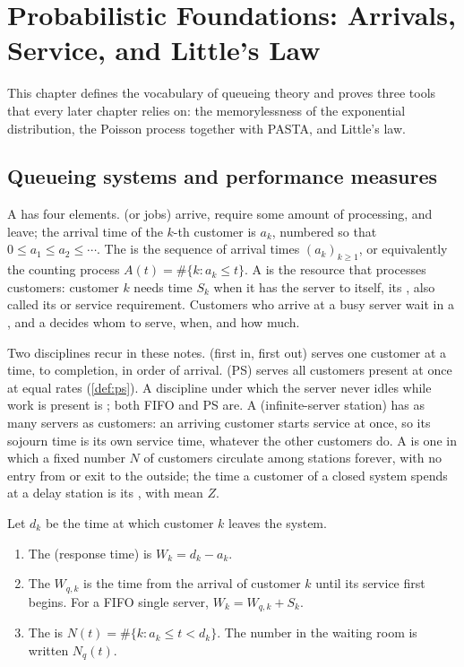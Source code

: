 \chapter{Probabilistic Foundations: Arrivals, Service, and Little's Law}\label{sec:L1}

This chapter defines the vocabulary of queueing theory and proves three tools that
every later chapter relies on: the memorylessness of the exponential distribution,
the Poisson process together with PASTA, and Little's law.

\section{Queueing systems and performance measures}\label{L1:sec:systems}

A  has four elements.  (or jobs) arrive, require
some amount of processing, and leave; the arrival time of the $k$-th customer is $a_k$,
numbered so that $0\le a_1\le a_2\le\cdots$. The  is the sequence
of arrival times $(a_k)_{k\ge1}$, or equivalently the counting process
$A(t)=\#\{k: a_k\le t\}$. A  is the resource that processes customers:
customer $k$ needs time $S_k$ when it has the server to itself, its ,
also called its  or service requirement. Customers who arrive at a busy
server wait in a , and a  decides whom to
serve, when, and how much.

Two disciplines recur in these notes.  (first in, first out) serves one
customer at a time, to completion, in order of arrival.  (PS)
serves all customers present at once at equal rates (\cref{def:ps}). A discipline under
which the server never idles while work is present is ; both FIFO
and PS are. A  (infinite-server station) has as many servers as
customers: an arriving customer starts service at once, so its sojourn time is its own
service time, whatever the other customers do. A  is one in which a
fixed number $N$ of customers circulate among stations forever, with no entry from or
exit to the outside; the time a customer of a closed system spends at a delay station
is its , with mean $Z$.

\begin{definition}\label{L1:def:measures}
Let $d_k$ be the time at which customer $k$ leaves the system.
\begin{enumerate}
\item The  (response time) is $W_k=d_k-a_k$.
\item The  $W_{q,k}$ is the time from the arrival of customer $k$
  until its service first begins. For a FIFO single server, $W_k=W_{q,k}+S_k$.
\item The  is $N(t)=\#\{k: a_k\le t<d_k\}$. The number in the
  waiting room is written $N_q(t)$.
\end{enumerate}
\end{definition}

